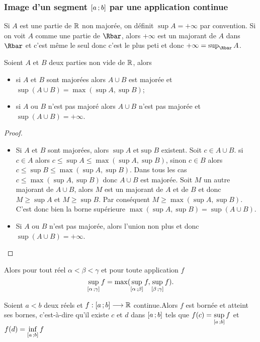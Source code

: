 \subsubsection[Image continue d'un segment]{Image d'un segment $\left[ a \, ;  b \right]$ par une application continue}

Si $A$ est une partie de $\mathbb{R}$ non majorée, on définit $\sup A = + \infty$ par convention. Si on voit $A$ comme une partie de $\Rbar$, alors $+\infty$ est un majorant de $A$ dans $\Rbar$ et c'est même le seul donc c'est le plus peti et donc $+\infty=\sup_{\Rbar} A$.

\begin{lemme}
  Soient $A$ et $B$ deux parties non vide de $\mathbb{R}$, alors
  \begin{itemize}
  \item si $A$ et $B$ sont majorées alors $A \cup B$ est majorée et $\sup(A\cup B)=\max(\sup A, \sup B)$;
  \item si $A$ ou $B$ n'est pas majoré alors $A \cup B$ n'est pas majorée et $\sup(A\cup B)=+\infty$.
  \end{itemize}
\end{lemme}
\begin{proof}
  \begin{itemize}
  \item Si $A$ et $B$ sont majorées, alors $\sup A$ et$\sup B$ existent. Soit $c \in A \cup B$. si $c \in A$ alors $c \leq \sup A \leq \max(\sup A, \sup B)$, sinon $c \in B$ alors $c \leq \sup B \leq \max(\sup A, \sup B)$. Dans tous les cas $c \leq \max(\sup A, \sup B)$ donc $A \cup B$ est majorée. Soit $M$ un autre majorant de $A \cup B$, alors $M$ est un majorant de $A$ et de $B$ et donc $M \geq \sup A$ et $M \geq \sup B$. Par conséquent $M \geq \max(\sup A, \sup B)$. C'est donc bien la borne supérieure $\max(\sup A, \sup B)=\sup(A \cup B)$.
  \item Si $A$ ou $B$ n'est pas majorée, alors l'union non plus et donc $\sup(A\cup B)=+\infty$.
\end{itemize}
\end{proof}
Alors pour tout réel $\alpha < \beta< \gamma$ et pour toute application $f$
\begin{equation}
  \sup\limits_{\left[ \alpha \, ;  \gamma \right]}f=\max(\sup\limits_{\left[ \alpha \, ;  \beta \right]}f,\sup\limits_{\left[ \beta \, ;  \gamma \right]}f).
\end{equation}
%
\begin{theo}
  Soient $a<b$ deux réels et $f:\left[ a \, ;  b \right] \longrightarrow \mathbb{R}$ continue.Alors $f$ est bornée et atteint ses bornes, c'est-à-dire qu'il existe $c$ et $d$ dans $\left[ a \, ;  b \right]$ tels que $f(c)=\sup\limits_{\left[ a \, ;  b \right]}f$ et $f(d)=\inf\limits_{\left[ a \, ;  b \right]}f$
\end{theo}
